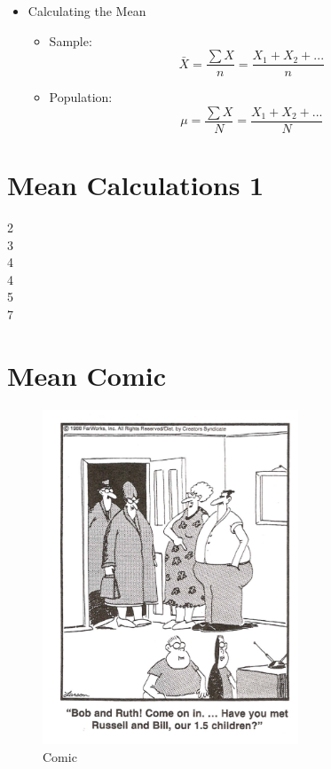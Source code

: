\documentclass[12pt]{article}
\begin{document}
\begin{itemize}
\itemsep1pt\parskip0pt
\item
  Calculating the Mean

  \begin{itemize}
  \itemsep1pt\parskip0pt
  \item
    Sample:
    \[\bar{X} = \frac{\sum X}{n} = \frac{X_{1} + X_{2} + ...}{n} \]
  \item
    Population:
    \[\mu = \frac{\sum X}{N} = \frac{X_{1} + X_{2} + ...}{N} \]
  \end{itemize}
\end{itemize}

\section{Mean Calculations 1}\label{mean-calculations-1}

2\\3\\4\\4\\5\\7

\section{Mean Comic}\label{mean-comic}

\begin{figure}[H]
\centering
\includegraphics[width=3in]{farside.png}
\caption{Comic}
\end{figure}
\end{document}
